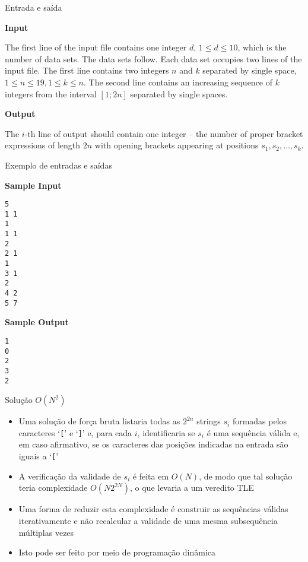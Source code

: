 \begin{frame}[fragile]{Entrada e saída}

\textbf{Input}

The first line of the input file contains one integer $d$, $1 \leq d \leq 10$, which is the number
of data sets. The data sets follow. Each data set occupies two lines of the input file. The first
line contains two integers $n$ and $k$ separated by single space, $1 \leq n \leq 19, 1 \leq k \leq
n$. The second line contains an increasing sequence of $k$ integers from the interval $[1;2n]$
separated by single spaces.

\vspace{0.2in}

\textbf{Output}

The $i$-th line of output should contain one integer -- the number of proper bracket expressions of
length $2n$ with opening brackets appearing at positions $s_1, s_2, \ldots, s_k$.

\end{frame}

\begin{frame}[fragile]{Exemplo de entradas e saídas}

\begin{minipage}[t]{0.45\textwidth}
\textbf{Sample Input}
\begin{verbatim}
5 
1 1 
1 
1 1 
2 
2 1 
1 
3 1 
2 
4 2 
5 7 
\end{verbatim}
\end{minipage}
\begin{minipage}[t]{0.5\textwidth}
\textbf{Sample Output}
\begin{verbatim}
1 
0 
2 
3 
2 
\end{verbatim}
\end{minipage}
\end{frame}

\begin{frame}[fragile]{Solução $O(N^2)$}

    \begin{itemize}
        \item Uma solução de força bruta listaria todas as $2^{2n}$ strings $s_i$ formadas pelos 
            caracteres `\texttt{[}' e `\texttt{]}' e, para cada $i$, identificaria se $s_i$ é uma
            sequência válida e, em caso afirmativo, se os caracteres das posições indicadas na
            entrada são iguais a `\texttt{[}'

        \item A verificação da validade de $s_i$ é feita em $O(N)$, de modo que tal solução teria
            complexidade $O(N2^{2N})$, o que levaria a um veredito TLE

        \item Uma forma de reduzir esta complexidade é construir as sequências válidas
            iterativamente e não recalcular a validade de uma mesma subsequência múltiplas vezes

        \item Isto pode ser feito por meio de programação dinâmica
    \end{itemize}

\end{frame}


